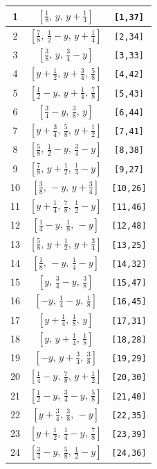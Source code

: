 \documentclass[fleqn,8pt]{jsarticle}
\begin{document}
\begin{longtable}{ccc}
1 & $\left[ \frac{1}{8},\, y,\, y + \frac{1}{4} \right]$ & {\tt [1,37]} \\ \hline
2 & $\left[ \frac{7}{8},\, \frac{1}{2} - y,\, y + \frac{1}{4} \right]$ & {\tt [2,34]} \\ \hline
3 & $\left[ \frac{3}{8},\, y,\, \frac{3}{4} - y \right]$ & {\tt [3,33]} \\ \hline
4 & $\left[ y + \frac{1}{2},\, y + \frac{3}{4},\, \frac{5}{8} \right]$ & {\tt [4,42]} \\ \hline
5 & $\left[ \frac{1}{2} - y,\, y + \frac{1}{4},\, \frac{7}{8} \right]$ & {\tt [5,43]} \\ \hline
6 & $\left[ \frac{3}{4} - y,\, \frac{3}{8},\, y \right]$ & {\tt [6,44]} \\ \hline
7 & $\left[ y + \frac{3}{4},\, \frac{5}{8},\, y + \frac{1}{2} \right]$ & {\tt [7,41]} \\ \hline
8 & $\left[ \frac{5}{8},\, \frac{1}{2} - y,\, \frac{3}{4} - y \right]$ & {\tt [8,38]} \\ \hline
9 & $\left[ \frac{7}{8},\, y + \frac{1}{2},\, \frac{1}{4} - y \right]$ & {\tt [9,27]} \\ \hline
10 & $\left[ \frac{3}{8},\, - y,\, y + \frac{3}{4} \right]$ & {\tt [10,26]} \\ \hline
11 & $\left[ y + \frac{1}{4},\, \frac{7}{8},\, \frac{1}{2} - y \right]$ & {\tt [11,46]} \\ \hline
12 & $\left[ \frac{1}{4} - y,\, \frac{1}{8},\, - y \right]$ & {\tt [12,48]} \\ \hline
13 & $\left[ \frac{5}{8},\, y + \frac{1}{2},\, y + \frac{3}{4} \right]$ & {\tt [13,25]} \\ \hline
14 & $\left[ \frac{1}{8},\, - y,\, \frac{1}{4} - y \right]$ & {\tt [14,32]} \\ \hline
15 & $\left[ y,\, \frac{3}{4} - y,\, \frac{3}{8} \right]$ & {\tt [15,47]} \\ \hline
16 & $\left[ - y,\, \frac{1}{4} - y,\, \frac{1}{8} \right]$ & {\tt [16,45]} \\ \hline
17 & $\left[ y + \frac{1}{4},\, \frac{1}{8},\, y \right]$ & {\tt [17,31]} \\ \hline
18 & $\left[ y,\, y + \frac{1}{4},\, \frac{1}{8} \right]$ & {\tt [18,28]} \\ \hline
19 & $\left[ - y,\, y + \frac{3}{4},\, \frac{3}{8} \right]$ & {\tt [19,29]} \\ \hline
20 & $\left[ \frac{1}{4} - y,\, \frac{7}{8},\, y + \frac{1}{2} \right]$ & {\tt [20,30]} \\ \hline
21 & $\left[ \frac{1}{2} - y,\, \frac{3}{4} - y,\, \frac{5}{8} \right]$ & {\tt [21,40]} \\ \hline
22 & $\left[ y + \frac{3}{4},\, \frac{3}{8},\, - y \right]$ & {\tt [22,35]} \\ \hline
23 & $\left[ y + \frac{1}{2},\, \frac{1}{4} - y,\, \frac{7}{8} \right]$ & {\tt [23,39]} \\ \hline
24 & $\left[ \frac{3}{4} - y,\, \frac{5}{8},\, \frac{1}{2} - y \right]$ & {\tt [24,36]} \\
\end{longtable}
\end{document}

